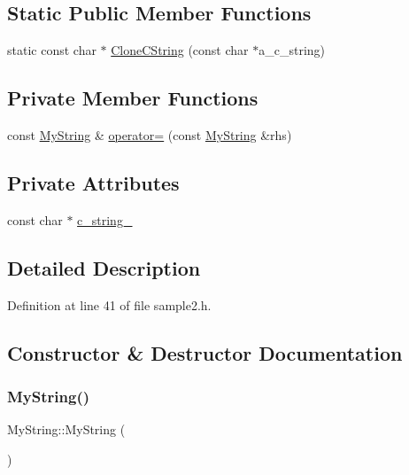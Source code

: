 \subsection*{Static Public Member Functions}
\begin{DoxyCompactItemize}
\item 
static const char $\ast$ \hyperlink{classMyString_a40753dcfa3314a8993f32bdd75d67ce2}{Clone\+C\+String} (const char $\ast$a\+\_\+c\+\_\+string)
\end{DoxyCompactItemize}
\subsection*{Private Member Functions}
\begin{DoxyCompactItemize}
\item 
const \hyperlink{classMyString}{My\+String} \& \hyperlink{classMyString_a0156d24764b9d8e4303763750f95cd38}{operator=} (const \hyperlink{classMyString}{My\+String} \&rhs)
\end{DoxyCompactItemize}
\subsection*{Private Attributes}
\begin{DoxyCompactItemize}
\item 
const char $\ast$ \hyperlink{classMyString_a1872c0d04ff5f6e654161472b18bb9d0}{c\+\_\+string\+\_\+}
\end{DoxyCompactItemize}


\subsection{Detailed Description}


Definition at line 41 of file sample2.\+h.



\subsection{Constructor \& Destructor Documentation}
\mbox{\label{classMyString_a1cb17852b83614394b59720779c5f918}} 
\subsubsection{\texorpdfstring{My\+String()}{MyString()}\hspace{0.1cm}{\footnotesize\ttfamily [1/3]}}
{\footnotesize\ttfamily My\+String\+::\+My\+String (\begin{DoxyParamCaption}{ }\end{DoxyParamCaption})\hspace{0.3cm}{\ttfamily [inline]}}



